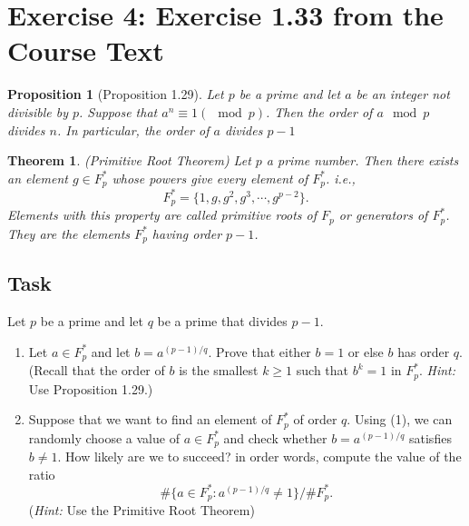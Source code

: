 \documentclass[12pt]{article}
\newtheorem{thm}[subsection]{Theorem}
\newtheorem{pro}[subsection]{Proposition}
\theoremstyle{definition}
\begin{document}
\section*{Exercise 4: Exercise 1.33 from the Course Text}
\begin{pro}[Proposition 1.29]
    Let $p$ be a prime and let $a$ be an integer not divisible by $p$. Suppose that
    $a^n \equiv 1 (\mod p)$. Then the order of $a\mod p$ divides $n$. In particular, 
    the order of $a$ divides $p-1$
\end{pro}

\begin{thm}(Primitive Root Theorem)
Let $p$ a prime number. Then there exists an element $g \in F^*_p$ whose powers give 
every element of $F^*_p$. i.e., $$F^*_p = \{1, g, g^2, g^3, \cdots, g^{p-2}\}.$$ Elements
with this property are called \emph{primitive roots} of $F_p$ or \emph{generators} of $F^*_p$. 
They are the elements $F^*_p$ having order $p-1$.
\end{thm}

\subsection*{Task}
Let $p$ be a prime and let $q$ be a prime that divides $p-1$.
\begin{enumerate}
    \item Let $a\in F^*_p$ and let $b=a^{(p-1)/q}.$ Prove that either $b=1$ or else $b$ has order $q$.
    (Recall that the order of $b$ is the smallest $k\ge 1$ such that $b^k = 1$ in $F^*_p$. \emph{Hint:}
    Use Proposition 1.29.)

    \item  Suppose that we want to find an element of $F^*_p$ of order $q$. Using (1), we can randomly
    choose a value of $a \in F^*_p$ and check whether $b = a^{(p-1)/q}$ satisfies $b\ne 1.$ How likely
    are we to succeed? in order words, compute the value of the ratio 
    $$\#\{a \in F^*_p : a^{(p-1)/q} \ne 1\}/ \# F^*_p.$$
    (\emph{Hint:} Use the Primitive Root Theorem) 
\end{enumerate}
\end{document}
